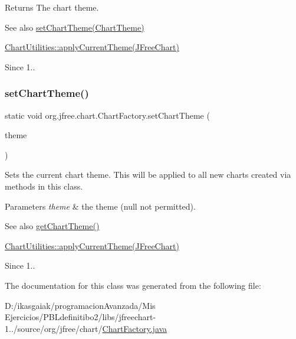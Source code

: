 \begin{DoxyReturn}{Returns}
The chart theme.
\end{DoxyReturn}
\begin{DoxySeeAlso}{See also}
\mbox{\hyperlink{classorg_1_1jfree_1_1chart_1_1_chart_factory_a413867a6a72db2c4c424f9eb76592a69}{set\+Chart\+Theme(\+Chart\+Theme)}} 

\mbox{\hyperlink{classorg_1_1jfree_1_1chart_1_1_chart_utilities_a2689d5e3124cb8d038a61cd8f2f68d51}{Chart\+Utilities\+::apply\+Current\+Theme(\+J\+Free\+Chart)}}
\end{DoxySeeAlso}
\begin{DoxySince}{Since}
1.. 
\end{DoxySince}
\mbox{\label{classorg_1_1jfree_1_1chart_1_1_chart_factory_a413867a6a72db2c4c424f9eb76592a69}} 
\subsubsection{\texorpdfstring{set\+Chart\+Theme()}{setChartTheme()}}
{\footnotesize\ttfamily static void org.\+jfree.\+chart.\+Chart\+Factory.\+set\+Chart\+Theme (\begin{DoxyParamCaption}\item[{\mbox{\hyperlink{interfaceorg_1_1jfree_1_1chart_1_1_chart_theme}{Chart\+Theme}}}]{theme }\end{DoxyParamCaption})\hspace{0.3cm}{\ttfamily [static]}}

Sets the current chart theme. This will be applied to all new charts created via methods in this class.


\begin{DoxyParams}{Parameters}
{\em theme} & the theme ({\ttfamily null} not permitted).\\
\hline
\end{DoxyParams}
\begin{DoxySeeAlso}{See also}
\mbox{\hyperlink{classorg_1_1jfree_1_1chart_1_1_chart_factory_a97de42d02f96b00dc7a3f409d52987d4}{get\+Chart\+Theme()}} 

\mbox{\hyperlink{classorg_1_1jfree_1_1chart_1_1_chart_utilities_a2689d5e3124cb8d038a61cd8f2f68d51}{Chart\+Utilities\+::apply\+Current\+Theme(\+J\+Free\+Chart)}}
\end{DoxySeeAlso}
\begin{DoxySince}{Since}
1.. 
\end{DoxySince}


The documentation for this class was generated from the following file\+:\begin{DoxyCompactItemize}
\item 
D\+:/ikasgaiak/programacion\+Avanzada/\+Mis Ejercicios/\+P\+B\+Ldefinitibo2/libs/jfreechart-\/1../source/org/jfree/chart/\mbox{\hyperlink{_chart_factory_8java}{Chart\+Factory.\+java}}\end{DoxyCompactItemize}
